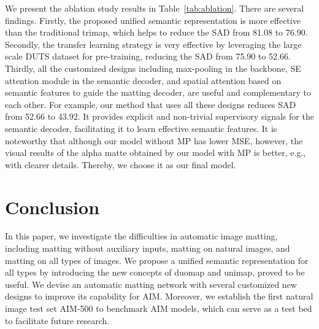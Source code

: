 \documentclass{article}
\begin{document}
We present the ablation study results in Table~\ref{tab:ablation}. There are several findings. Firstly, the proposed unified semantic representation is more effective than the traditional trimap, which  helps to reduce the SAD from 81.08 to 76.90. Secondly, the transfer learning strategy is very effective by leveraging the large scale DUTS dataset for pre-training, reducing the SAD from 75.90 to 52.66. Thirdly, all the customized designs including max-pooling in the backbone, SE attention module in the semantic decoder, and spatial attention based on semantic features to guide the matting decoder, are useful and complementary to each other. For example, our method that uses all these designs reduces SAD from 52.66 to 43.92. It provides explicit and non-trivial supervisory signals for the semantic decoder, facilitating it to learn effective semantic features. It is noteworthy that although our model without MP has lower MSE, however, the visual results of the alpha matte obtained by our model with MP is better, e.g., with clearer details. Thereby, we choose it as our final model.

\section{Conclusion}

In this paper, we investigate the difficulties in automatic image matting, including matting without auxiliary inputs, matting on natural images, and matting on all types of images. We propose a unified semantic representation for all types by introducing the new concepts of duomap and unimap, proved to be useful. We devise an automatic matting network with several customized new designs to improve its capability for AIM. Moreover, we establish the first natural image test set AIM-500 to benchmark AIM models, which can serve as a test bed to facilitate future research. 



\end{document}

